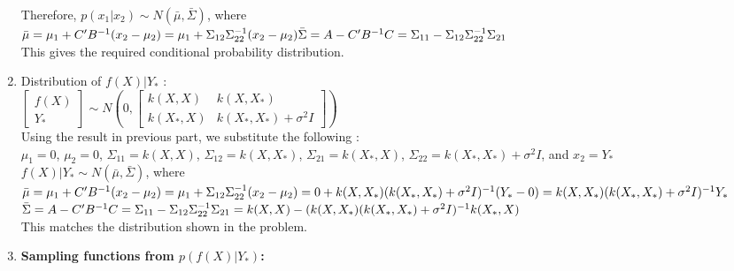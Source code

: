 \begin{enumerate}
{	Therefore, $p(x_{1} | x_{2}) \sim N ( \bar{\mu}, \bar{\Sigma})$, where\\
	
	$\bar{\mu} = \mu_{1} + C'B^{-1}(x_{2} - \mu_{2}) =  \mu_{1} + \Sigma_{12}\Sigma_{22}^{-1}(x_{2} - \mu_{2}) \\
	\bar{\Sigma} = A - C'B^{-1}C = \Sigma_{11} - \Sigma_{12}\Sigma_{22}^{-1}\Sigma_{21}$\\
	
	
	This gives the required conditional probability distribution.
	}
	
	\item{
	Distribution of $f(X) | Y_{*}$ :\\
	
	$\begin{bmatrix}
	f(X) \\
	Y_{*}
	\end{bmatrix} \sim N ( 0, 
	\begin{bmatrix}
	k(X,X) & k(X,X_{*}) \\
	k(X_{*},X) & k(X_{*},X_{*}) + \sigma^{2}I	
	\end{bmatrix} )$	\\	
		
	Using the result in previous part, we substitute the following :\\
	
	$\mu_{1} = 0$, $\mu_{2} = 0$, $\Sigma_{11} = k(X,X)$, $\Sigma_{12} = k(X,X_{*})$, $\Sigma_{21} = k(X_{*},X)$, $\Sigma_{22} = k(X_{*},X_{*}) + \sigma^{2}I$, and $x_{2} = Y_{*}$\\
		
	$f(X) | Y_{*} \sim N ( \bar{\mu}, \bar{\Sigma})$,	where\\	
	
	$\bar{\mu} = \mu_{1} + C'B^{-1}(x_{2} - \mu_{2}) =  \mu_{1} + \Sigma_{12}\Sigma_{22}^{-1}(x_{2} - \mu_{2})\\
		= 0 +  k(X,X_{*})(k(X_{*},X_{*}) + \sigma^{2}I)^{-1} (Y_{*} - 0) \\
		= k(X,X_{*})(k(X_{*},X_{*}) + \sigma^{2}I)^{-1}Y_{*}$\\

	$\bar{\Sigma} = A - C'B^{-1}C = \Sigma_{11} - \Sigma_{12}\Sigma_{22}^{-1}\Sigma_{21} \\
		= k(X,X) - (k(X,X_{*})(k(X_{*},X_{*}) + \sigma^{2}I)^{-1}k(X_{*},X)$\\

	This matches the distribution shown in the problem. 			
	}
	
	\item{
		\textbf{Sampling functions from $p(f(X) | Y_{*})$:}\\
		
}
\end{enumerate}
